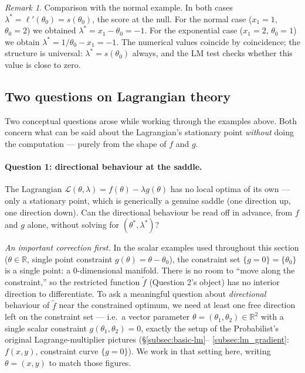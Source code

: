 \documentclass[a4paper,oneside,12pt]{extarticle}
\theoremstyle{plain}
\theoremstyle{definition}
\theoremstyle{remark}
\newtheorem{remark}[proposition]{Remark}
\begin{document}
\begin{remark}
  Comparison with the normal example.  In both cases
  $\lambda^* = \ell'(\theta_0) = s(\theta_0)$, the score at the
  null.  For the normal case ($x_1=1$, $\theta_0=2$) we obtained
  $\lambda^* = x_1 - \theta_0 = -1$.
  For the exponential case ($x_1=2$, $\theta_0=1$) we obtain
  $\lambda^* = 1/\theta_0 - x_1 = -1$.
  The numerical values coincide by coincidence; the structure is
  universal: $\lambda^* = s(\theta_0)$ always, and the LM test
  checks whether this value is close to zero.
\end{remark}

\subsection{Two questions on Lagrangian theory}
\label{subsec:lm_theory_questions}

Two conceptual questions arose while working through the examples
above.  Both concern what can be said about the Lagrangian's
stationary point \emph{without} doing the computation --- purely
from the shape of $f$ and $g$.

\paragraph{Question 1: directional behaviour at the saddle.}
The Lagrangian $\mathcal{L}(\theta,\lambda)=f(\theta)-\lambda g(\theta)$
has no local optima of its own --- only a stationary point, which is
generically a genuine saddle (one direction up, one direction down).
Can the directional behaviour be read off in advance, from $f$ and
$g$ alone, without solving for $(\theta^*,\lambda^*)$?

\emph{An important correction first.}
In the scalar examples used throughout this section ($\theta\in\mathbb{R}$,
single point constraint $g(\theta)=\theta-\theta_0$), the constraint
set $\{g=0\}=\{\theta_0\}$ is a single point: a $0$-dimensional
manifold.  There is no room to ``move along the constraint,'' so
the restricted function $\tilde f$ (Question 2's object) has no
interior direction to differentiate.  To ask a meaningful question
about \emph{directional} behaviour of $\tilde f$ near the
constrained optimum, we need at least one free direction left on
the constraint set --- i.e.\ a vector parameter
$\theta=(\theta_1,\theta_2)\in\mathbb{R}^2$ with a single scalar
constraint $g(\theta_1,\theta_2)=0$, exactly the setup of
the Probabilist's original Lagrange-multiplier pictures (\S\ref{subsec:basic-lm}--%
\ref{subsec:lm_gradient}: $f(x,y)$, constraint curve $\{g=0\}$).
We work in that setting here, writing $\theta=(x,y)$ to match those
figures.
\end{document}
